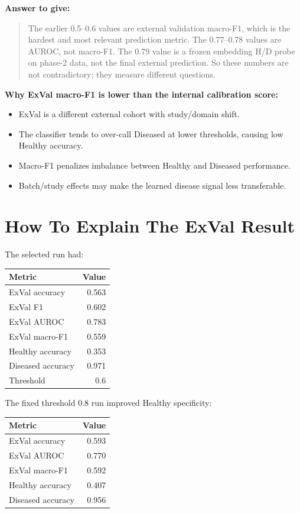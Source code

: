 \documentclass[11pt]{article}
\begin{document}
\textbf{Answer to give:}

\begin{quote}
The earlier 0.5--0.6 values are external validation macro-F1, which is the hardest and
most relevant prediction metric. The 0.77--0.78 values are AUROC, not macro-F1. The 0.79
value is a frozen embedding H/D probe on phase-2 data, not the final external prediction.
So these numbers are not contradictory; they measure different questions.
\end{quote}

\textbf{Why ExVal macro-F1 is lower than the internal calibration score:}

\begin{itemize}
  \item ExVal is a different external cohort with study/domain shift.
  \item The classifier tends to over-call Diseased at lower thresholds, causing low Healthy
  accuracy.
  \item Macro-F1 penalizes imbalance between Healthy and Diseased performance.
  \item Batch/study effects may make the learned disease signal less transferable.
\end{itemize}

\section{How To Explain The ExVal Result}

The selected run had:

\begin{center}
\begin{tabular}{lr}
\toprule
Metric & Value \\
\midrule
ExVal accuracy & 0.563 \\
ExVal F1 & 0.602 \\
ExVal AUROC & 0.783 \\
ExVal macro-F1 & 0.559 \\
Healthy accuracy & 0.353 \\
Diseased accuracy & 0.971 \\
Threshold & 0.6 \\
\bottomrule
\end{tabular}
\end{center}

The fixed threshold 0.8 run improved Healthy specificity:

\begin{center}
\begin{tabular}{lr}
\toprule
Metric & Value \\
\midrule
ExVal accuracy & 0.593 \\
ExVal AUROC & 0.770 \\
ExVal macro-F1 & 0.592 \\
Healthy accuracy & 0.407 \\
Diseased accuracy & 0.956 \\
\bottomrule
\end{tabular}
\end{center}
\end{document}
